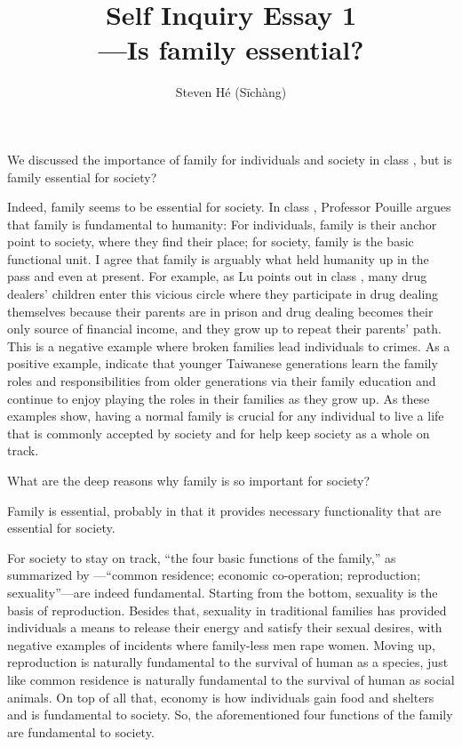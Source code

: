 \documentclass[12pt]{article}
\title{Self Inquiry Essay 1\\—Is family essential?}
\author{Steven Hé (Sīchàng)}
\begin{document}
\maketitle
We discussed the importance of family for individuals and society
in class \citep{pouille2023ethics},
but is family essential for society?

Indeed, family seems to be essential for society.
In class \citep{pouille2023ethics},
Professor Pouille argues that family is fundamental to humanity:
For individuals, family is their anchor point to society,
where they find their place;
for society, family is the basic functional unit.
I agree that family is arguably what held humanity up in the pass and even at
present.
For example, as Lu points out in class \citep{pouille2023ethics},
many drug dealers' children enter this vicious circle where
they participate in drug dealing themselves because their parents are in prison
and drug dealing becomes their only source of financial income,
and they grow up to repeat their parents' path.
This is a negative example where broken families lead individuals to crimes.
As a positive example, \citet{lu1998family} indicate that
younger Taiwanese generations learn the family roles and responsibilities from
older generations via their family education and
continue to enjoy playing the roles in their families as they grow up.
As these examples show, having a normal family is crucial for any individual to
live a life that is commonly accepted by society and for help keep society as a
whole on track.

What are the deep reasons why family is so important for society?

Family is essential, probably in that it provides necessary functionality
that are essential for society.

For society to stay on track, ``the four basic functions of the family,''
as summarized by \citet[p. 60]{gittins1993family}—``common residence;
economic co-operation; reproduction; sexuality''—are indeed fundamental.
Starting from the bottom, sexuality is the basis of reproduction.
Besides that, sexuality in traditional families has provided individuals
a means to release their energy and satisfy their sexual desires,
with negative examples of incidents where family-less men rape women.
Moving up, reproduction is naturally fundamental to the survival of human as
a species, just like common residence is naturally fundamental to the survival
of human as social animals.
On top of all that, economy is how individuals gain food and shelters and
is fundamental to society.
So, the aforementioned four functions of the family are fundamental to society.
\end{document}
